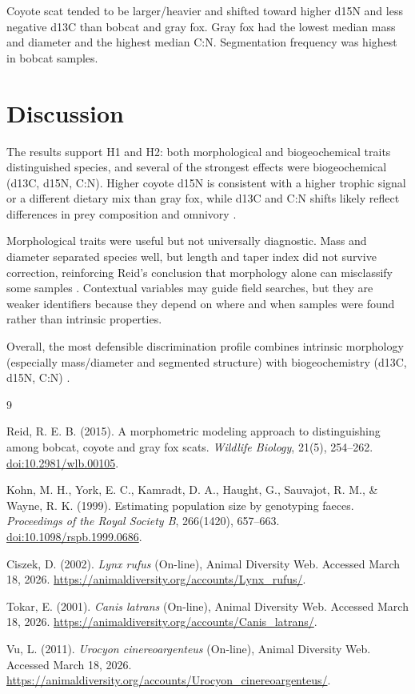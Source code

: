 \documentclass[10pt,a4paper]{article}
\begin{document}
Coyote scat tended to be larger/heavier and shifted toward higher d15N and less negative d13C than bobcat and gray fox. Gray fox had the lowest median mass and diameter and the highest median C:N. Segmentation frequency was highest in bobcat samples.

\section{Discussion}
The results support H1 and H2: both morphological and biogeochemical traits distinguished species, and several of the strongest effects were biogeochemical (d13C, d15N, C:N). Higher coyote d15N is consistent with a higher trophic signal or a different dietary mix than gray fox, while d13C and C:N shifts likely reflect differences in prey composition and omnivory \cite{reid2015,adw_coyote,adw_grayfox}.

Morphological traits were useful but not universally diagnostic. Mass and diameter separated species well, but length and taper index did not survive correction, reinforcing Reid's conclusion that morphology alone can misclassify some samples \cite{reid2015}. Contextual variables may guide field searches, but they are weaker identifiers because they depend on where and when samples were found rather than intrinsic properties.

Overall, the most defensible discrimination profile combines intrinsic morphology (especially mass/diameter and segmented structure) with biogeochemistry (d13C, d15N, C:N) \cite{kohn1999}.

\FloatBarrier
\newpage

\begin{thebibliography}{9}

Reid, R. E. B. (2015).
A morphometric modeling approach to distinguishing among bobcat, coyote and gray fox scats.
\textit{Wildlife Biology}, 21(5), 254--262.
\href{https://doi.org/10.2981/wlb.00105}{doi:10.2981/wlb.00105}.

Kohn, M. H., York, E. C., Kamradt, D. A., Haught, G., Sauvajot, R. M., \& Wayne, R. K. (1999).
Estimating population size by genotyping faeces.
\textit{Proceedings of the Royal Society B}, 266(1420), 657--663.
\href{https://doi.org/10.1098/rspb.1999.0686}{doi:10.1098/rspb.1999.0686}.

Ciszek, D. (2002).
\textit{Lynx rufus} (On-line), Animal Diversity Web.
Accessed March 18, 2026.
\url{https://animaldiversity.org/accounts/Lynx_rufus/}.

Tokar, E. (2001).
\textit{Canis latrans} (On-line), Animal Diversity Web.
Accessed March 18, 2026.
\url{https://animaldiversity.org/accounts/Canis_latrans/}.

Vu, L. (2011).
\textit{Urocyon cinereoargenteus} (On-line), Animal Diversity Web.
Accessed March 18, 2026.
\url{https://animaldiversity.org/accounts/Urocyon_cinereoargenteus/}.

\end{thebibliography}
\end{document}
